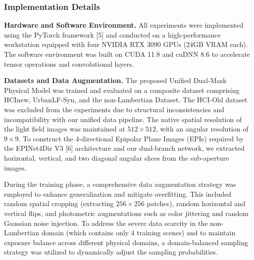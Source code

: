 \begin{table}[!t]
\small
\caption{Dataset Domain / Scene Type Spatial Resolution.}
\label{tab:table1}
\centering
{}
\end{table}
\subsubsection{Implementation Details}

\textbf{Hardware and Software Environment.} 
All experiments were implemented using the PyTorch framework [5] and conducted on a high-performance workstation equipped with four NVIDIA RTX 3090 GPUs (24GB VRAM each). The software environment was built on CUDA 11.8 and cuDNN 8.6 to accelerate tensor operations and convolutional layers. 

\textbf{Datasets and Data Augmentation.} 
The proposed Unified Dual-Mask Physical Model was trained and evaluated on a composite dataset comprising HCInew, UrbanLF-Syn, and the non-Lambertian Dataset. The HCI-Old dataset was excluded from the experiments due to structural inconsistencies and incompatibility with our unified data pipeline. The native spatial resolution of the light field images was maintained at $512 \times 512$, with an angular resolution of $9 \times 9$. To construct the 4-directional Epipolar Plane Images (EPIs) required by the EPINet4Dir V3 [6] architecture and our dual-branch network, we extracted horizontal, vertical, and two diagonal angular slices from the sub-aperture images. 

During the training phase, a comprehensive data augmentation strategy was employed to enhance generalization and mitigate overfitting. This included random spatial cropping (extracting $256 \times 256$ patches), random horizontal and vertical flips, and photometric augmentations such as color jittering and random Gaussian noise injection. To address the severe data scarcity in the non-Lambertian domain (which contains only 4 training scenes) and to maintain exposure balance across different physical domains, a domain-balanced sampling strategy was utilized to dynamically adjust the sampling probabilities.

